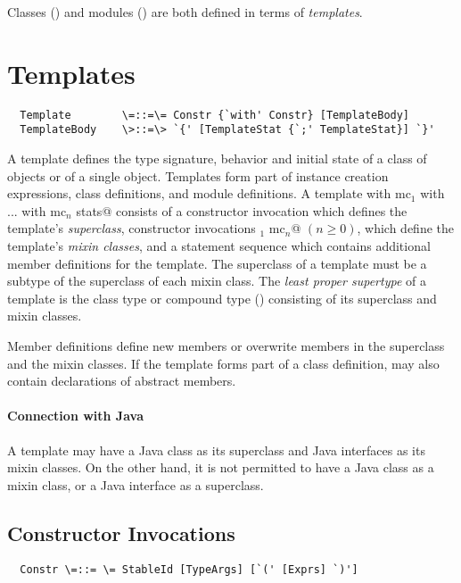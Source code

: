 \documentclass[11pt]{report}
\begin{document}
Classes () and modules
() are both defined in terms of {\em templates}.

\section{Templates}
\label{sec:templates}

\syntax\begin{verbatim}
  Template        \=::=\= Constr {`with' Constr} [TemplateBody]
  TemplateBody    \>::=\> `{' [TemplateStat {`;' TemplateStat}] `}'
\end{verbatim}

A template defines the type signature, behavior and initial state of a
class of objects or of a single object. Templates form part of
instance creation expressions, class definitions, and module
definitions.  A template
\verb@sc with mc$_1$ with ... with mc$_n$ {stats}@ consists of a
constructor invocation \verb@sc@ which defines the template's {\em
superclass}, constructor invocations \verb@mc$_1$ \commadots mc$_n$@
$(n \geq 0)$, which define the template's {\em mixin classes}, and a
statement sequence \verb@stats@ which contains additional member
definitions for the template.  The superclass of a template must be a
subtype of the superclass of each mixin class.  The {\em least proper
supertype} of a template is the class type or compound type
() consisting of its superclass and mixin
classes.

Member definitions define new members or overwrite members in the
superclass and the mixin classes.  If the template forms part of a
class definition, \verb@stats@ may also contain declarations of abstract
members. 

\paragraph{Connection with Java} A template may have a Java class as
its superclass and Java interfaces as its mixin classes. On the other
hand, it is not permitted to have a Java class as a mixin class, or a
Java interface as a superclass.

\subsection{Constructor Invocations}
\label{sec:constr-invoke}
\syntax\begin{verbatim}
  Constr \=::= \= StableId [TypeArgs] [`(' [Exprs] `)']  
\end{verbatim}
\end{document}
